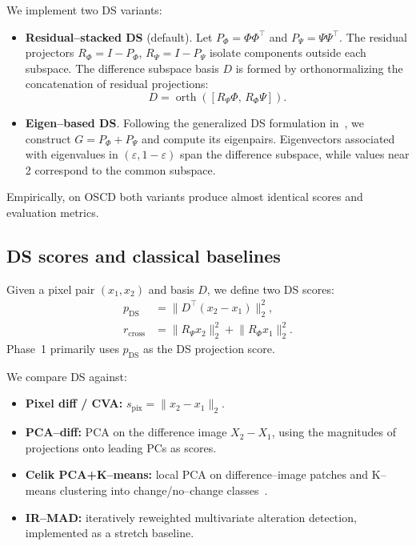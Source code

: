 \documentclass[twoside,11pt]{article}
\begin{document}
We implement two DS variants:
\begin{itemize}
  \item \textbf{Residual--stacked DS} (default). Let \(P_\Phi = \Phi \Phi^\top\)
  and \(P_\Psi = \Psi \Psi^\top\). The residual projectors
  \(R_\Phi = I - P_\Phi\), \(R_\Psi = I - P_\Psi\) isolate components outside
  each subspace. The difference subspace basis \(D\) is formed by
  orthonormalizing the concatenation of residual projections:
  \begin{equation}
      D = \operatorname{orth}\left(
      \left[ R_\Psi \Phi,\, R_\Phi \Psi \right]
      \right).
  \end{equation}

  \item \textbf{Eigen--based DS}. Following the generalized DS formulation
  in~\cite{FukuiMaki2015}, we construct
  \(G = P_\Phi + P_\Psi\) and compute its eigenpairs. Eigenvectors associated
  with eigenvalues in \((\varepsilon, 1-\varepsilon)\) span the difference
  subspace, while values near 2 correspond to the common subspace.
\end{itemize}

Empirically, on OSCD both variants produce almost identical scores and
evaluation metrics.

\subsection{DS scores and classical baselines}

Given a pixel pair \((x_1,x_2)\) and basis \(D\), we define two DS scores:
\begin{align}
p_{\text{DS}} &= \lVert D^\top (x_2 - x_1) \rVert_2^2,\\
r_{\text{cross}} &= \lVert R_\Psi x_2 \rVert_2^2 + \lVert R_\Phi x_1 \rVert_2^2.
\end{align}
Phase~1 primarily uses \(p_{\text{DS}}\) as the DS projection score.

We compare DS against:
\begin{itemize}
  \item \textbf{Pixel diff / CVA:} \(s_{\text{pix}} = \lVert x_2 - x_1
  \rVert_2\).
  \item \textbf{PCA--diff:} PCA on the difference image \(X_2 - X_1\), using
  the magnitudes of projections onto leading PCs as scores.
  \item \textbf{Celik PCA+K--means:} local PCA on difference--image patches and
  K--means clustering into change/no--change
  classes~\cite{Celik2009}.
  \item \textbf{IR--MAD:} iteratively reweighted multivariate alteration
  detection, implemented as a stretch baseline.
\end{itemize}
\end{document}
